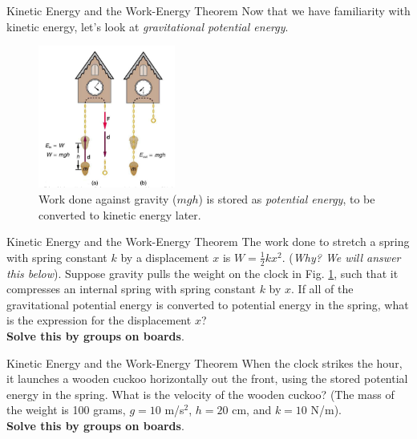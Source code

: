 \documentclass{beamer}
\begin{document}
\begin{frame}{Kinetic Energy and the Work-Energy Theorem}
Now that we have familiarity with kinetic energy, let's look at \textit{gravitational potential energy}.
\begin{figure}
\centering
\includegraphics[width=0.4\textwidth]{figures/clock.png}
\caption{\label{fig:clock} Work done against gravity ($m g h$) is stored as \textit{potential energy}, to be converted to kinetic energy later.}
\end{figure}
\end{frame}

\begin{frame}{Kinetic Energy and the Work-Energy Theorem}
The work done to stretch a spring with spring constant $k$ by a displacement $x$ is $W = \frac{1}{2}kx^2$.  (\textit{Why?  We will answer this below}).  Suppose gravity pulls the weight on the clock in Fig. \ref{fig:clock}, such that it compresses an internal spring with spring constant $k$ by $x$.  If all of the gravitational potential energy is converted to potential energy in the spring, what is the expression for the displacement $x$? \\ \vspace{1cm}
\textbf{Solve this by groups on boards}.
\end{frame}

\begin{frame}{Kinetic Energy and the Work-Energy Theorem}
When the clock strikes the hour, it launches a wooden cuckoo horizontally out the front, using the stored potential energy in the spring.  What is the velocity of the wooden cuckoo?  (The mass of the weight is 100 grams, $g = 10$ m/s$^2$, $h = 20$ cm, and $k = 10$ N/m).\\ \vspace{1cm}
\textbf{Solve this by groups on boards}.
\end{frame}
\end{document}
